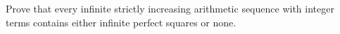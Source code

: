 Prove that every infinite strictly increasing arithmetic sequence with integer terms contains either infinite perfect squares or none.
